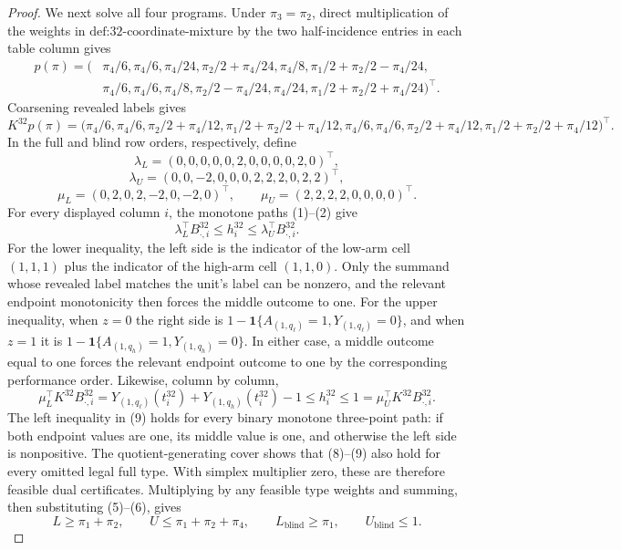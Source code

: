 \documentclass{article}
\begin{document}
\begin{proof}
We next solve all four programs.  Under \(\pi_3=\pi_2\), direct multiplication of the weights in \(\text{def:32-coordinate-mixture}\) by the two half-incidence entries in each table column gives
\[
\begin{aligned}
p(\pi)=\bigl(&\pi_4/6,\pi_4/6,\pi_4/24,\pi_2/2+\pi_4/24,\pi_4/8,
\pi_1/2+\pi_2/2-\pi_4/24,\\
&\pi_4/6,\pi_4/6,\pi_4/8,\pi_2/2-\pi_4/24,\pi_4/24,
\pi_1/2+\pi_2/2+\pi_4/24\bigr)^{\top}.
\end{aligned}
\tag{5}
\]
Coarsening revealed labels gives
\[
K^{32}p(\pi)=\bigl(\pi_4/6,\pi_4/6,\pi_2/2+\pi_4/12,
\pi_1/2+\pi_2/2+\pi_4/12,\pi_4/6,\pi_4/6,
\pi_2/2+\pi_4/12,\pi_1/2+\pi_2/2+\pi_4/12\bigr)^{\top}.
\tag{6}
\]
In the full and blind row orders, respectively, define
\[
\lambda_L=(0,0,0,0,0,2,0,0,0,0,2,0)^{\top},
\]
\[
\lambda_U=(0,0,-2,0,0,0,2,2,2,0,2,2)^{\top},
\]
\[
\mu_L=(0,2,0,2,-2,0,-2,0)^{\top},
\qquad
\mu_U=(2,2,2,2,0,0,0,0)^{\top}.
\tag{7}
\]
For every displayed column \(i\), the monotone paths (1)--(2) give
\[
\lambda_L^{\top}B^{32}_{\cdot,i}\leq h^{32}_i
\leq\lambda_U^{\top}B^{32}_{\cdot,i}.
\tag{8}
\]
For the lower inequality, the left side is the indicator of the low-arm cell \((1,1,1)\) plus the indicator of the high-arm cell \((1,1,0)\).  Only the summand whose revealed label matches the unit's label can be nonzero, and the relevant endpoint monotonicity then forces the middle outcome to one.  For the upper inequality, when \(z=0\) the right side is
\(1-\mathbf 1\{A_{(1,q_\ell)}=1,Y_{(1,q_\ell)}=0\}\), and when \(z=1\) it is
\(1-\mathbf 1\{A_{(1,q_h)}=1,Y_{(1,q_h)}=0\}\).  In either case, a middle outcome equal to one forces the relevant endpoint outcome to one by the corresponding performance order.  Likewise, column by column,
\[
\mu_L^{\top}K^{32}B^{32}_{\cdot,i}
=Y_{(1,q_\ell)}(t_i^{32})+Y_{(1,q_h)}(t_i^{32})-1
\leq h_i^{32}
\leq1
=\mu_U^{\top}K^{32}B^{32}_{\cdot,i}.
\tag{9}
\]
The left inequality in (9) holds for every binary monotone three-point path: if both endpoint values are one, its middle value is one, and otherwise the left side is nonpositive.  The quotient-generating cover shows that (8)--(9) also hold for every omitted legal full type.  With simplex multiplier zero, these are therefore feasible dual certificates.  Multiplying by any feasible type weights and summing, then substituting (5)--(6), gives
\[
L\geq\pi_1+\pi_2,
\qquad
U\leq\pi_1+\pi_2+\pi_4,
\qquad
L_{\mathrm{blind}}\geq\pi_1,
\qquad
U_{\mathrm{blind}}\leq1.
\tag{10}
\]


\end{proof}
\end{document}
